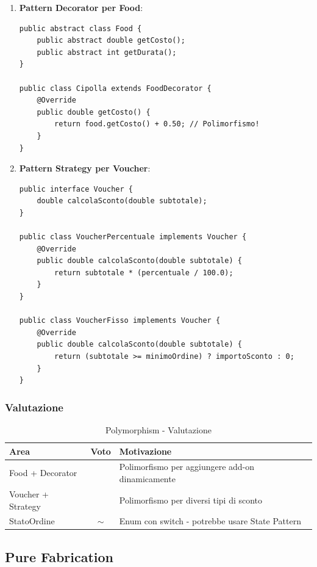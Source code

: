 \documentclass[12pt,a4paper]{article}
\newcommand{\ok}{\textcolor{okgreen}{\checkmark}}
\newcommand{\warn}{\textcolor{warnOrange}{$\sim$}}
\begin{document}
\begin{enumerate}
    \item \textbf{Pattern Decorator per Food}:
\begin{lstlisting}[style=javastyle]
public abstract class Food {
    public abstract double getCosto();
    public abstract int getDurata();
}

public class Cipolla extends FoodDecorator {
    @Override
    public double getCosto() {
        return food.getCosto() + 0.50; // Polimorfismo!
    }
}
\end{lstlisting}

    \item \textbf{Pattern Strategy per Voucher}:
\begin{lstlisting}[style=javastyle]
public interface Voucher {
    double calcolaSconto(double subtotale);
}

public class VoucherPercentuale implements Voucher {
    @Override
    public double calcolaSconto(double subtotale) {
        return subtotale * (percentuale / 100.0);
    }
}

public class VoucherFisso implements Voucher {
    @Override
    public double calcolaSconto(double subtotale) {
        return (subtotale >= minimoOrdine) ? importoSconto : 0;
    }
}
\end{lstlisting}
\end{enumerate}

\subsubsection{Valutazione}
\begin{table}[h]
\centering
\begin{tabular}{|l|c|p{8cm}|}
\hline
\textbf{Area} & \textbf{Voto} & \textbf{Motivazione} \\
\hline
Food + Decorator & \ok & Polimorfismo per aggiungere add-on dinamicamente \\
\hline
Voucher + Strategy & \ok & Polimorfismo per diversi tipi di sconto \\
\hline
StatoOrdine & \warn & Enum con switch - potrebbe usare State Pattern \\
\hline
\end{tabular}
\caption{Polymorphism - Valutazione}
\end{table}

\subsection{Pure Fabrication}
\end{document}
